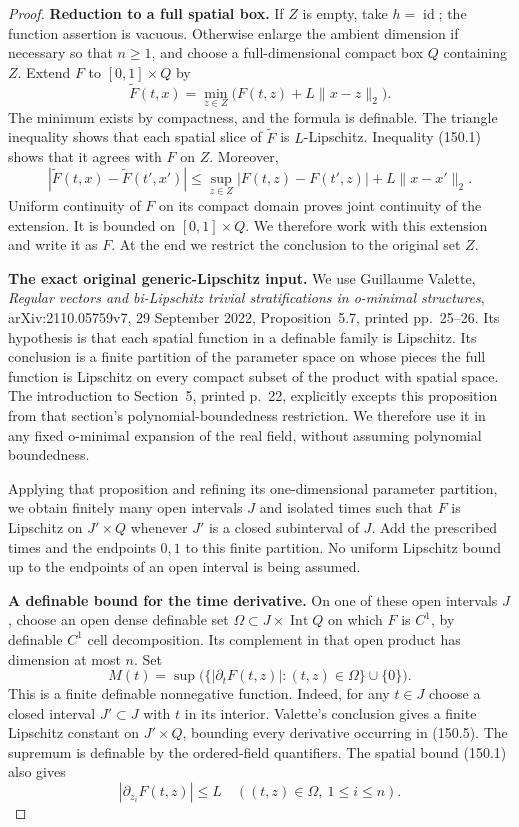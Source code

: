 \begin{proof}
\textbf{Reduction to a full spatial box.}\quad
If $Z$ is empty, take $h=\operatorname{id}$; the function assertion
is vacuous. Otherwise enlarge the ambient dimension if necessary so
that $n\ge1$, and choose a full-dimensional compact box $Q$ containing
$Z$. Extend $F$ to $[0,1]\times Q$ by
\[
 \widetilde F(t,x)=
 \min_{z\in Z}\bigl(F(t,z)+L\|x-z\|_2\bigr).
 \tag{150.4}
\]
The minimum exists by compactness, and the formula is definable.
The triangle inequality shows that each spatial slice of
$\widetilde F$ is $L$-Lipschitz. Inequality (150.1) shows that it
agrees with $F$ on $Z$. Moreover,
\[
 |\widetilde F(t,x)-\widetilde F(t',x')|
 \le \sup_{z\in Z}|F(t,z)-F(t',z)|+L\|x-x'\|_2.
\]
Uniform continuity of $F$ on its compact domain proves joint
continuity of the extension. It is bounded on $[0,1]\times Q$.
We therefore work with this extension and write it as $F$.
At the end we restrict the conclusion to the original set $Z$.

\textbf{The exact original generic-Lipschitz input.}\quad
We use Guillaume Valette, \emph{Regular vectors and bi-Lipschitz
trivial stratifications in o-minimal structures},
arXiv:2110.05759v7, 29 September 2022, Proposition~5.7,
printed pp.~25--26. Its hypothesis is that each spatial function
in a definable family is Lipschitz. Its conclusion is a finite
partition of the parameter space on whose pieces the full function
is Lipschitz on every compact subset of the product with spatial
space. The introduction to Section~5, printed p.~22, explicitly
excepts this proposition from that section's polynomial-boundedness
restriction. We therefore use it in any fixed o-minimal expansion
of the real field, without assuming polynomial boundedness.

Applying that proposition and refining its one-dimensional parameter
partition, we obtain finitely many open intervals $J$ and isolated
times such that $F$ is Lipschitz on $J'\times Q$ whenever $J'$ is a
closed subinterval of $J$. Add the prescribed times and the endpoints
$0,1$ to this finite partition. No uniform Lipschitz bound up to the
endpoints of an open interval is being assumed.

\textbf{A definable bound for the time derivative.}\quad
On one of these open intervals $J$, choose an open dense definable
set $\Omega\subset J\times\operatorname{Int}Q$ on which $F$ is
$C^1$, by definable $C^1$ cell decomposition. Its complement in that
open product has dimension at most $n$. Set
\[
 M(t)=\sup\bigl(\{|\partial_t F(t,z)|:
                      (t,z)\in\Omega\}\cup\{0\}\bigr).
 \tag{150.5}
\]
This is a finite definable nonnegative function. Indeed, for any
$t\in J$ choose a closed interval $J'\subset J$ with $t$ in its
interior. Valette's conclusion gives a finite Lipschitz constant on
$J'\times Q$, bounding every derivative occurring in (150.5).
The supremum is definable by the ordered-field quantifiers.
The spatial bound (150.1) also gives
\[
 |\partial_{z_i}F(t,z)|\le L
 \quad((t,z)\in\Omega,\ 1\le i\le n).
 \tag{150.6}
\]


\end{proof}
